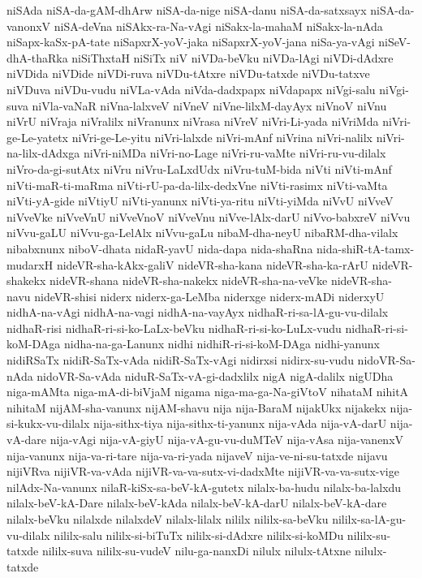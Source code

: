 {niSAda
niSA-da-gAM-dhArw
niSA-da-nige
niSA-danu
niSA-da-satxsayx
niSA-da-vanonxV
niSA-deVna
niSAkx-ra-Na-vAgi
niSakx-la-mahaM
niSakx-la-nAda
niSapx-kaSx-pA-tate
niSapxrX-yoV-jaka
niSapxrX-yoV-jana
niSa-ya-vAgi
niSeV-dhA-thaRka
niSiThxtaH
niSiTx
niV
niVDa-beVku
niVDa-lAgi
niVDi-dAdxre
niVDida
niVDide
niVDi-ruva
niVDu-tAtxre
niVDu-tatxde
niVDu-tatxve
niVDuva
niVDu-vudu
niVLa-vAda
niVda-dadxpapx
niVdapapx
niVgi-salu
niVgi-suva
niVla-vaNaR
niVna-lalxveV
niVneV
niVne-lilxM-dayAyx
niVnoV
niVnu
niVrU
niVraja
niVralilx
niVranunx
niVrasa
niVreV
niVri-Li-yada
niVriMda
niVri-ge-Le-yatetx
niVri-ge-Le-yitu
niVri-lalxde
niVri-mAnf
niVrina
niVri-nalilx
niVri-na-lilx-dAdxga
niVri-niMDa
niVri-no-Lage
niVri-ru-vaMte
niVri-ru-vu-dilalx
niVro-da-gi-sutAtx
niVru
niVru-LaLxdUdx
niVru-tuM-bida
niVti
niVti-mAnf
niVti-maR-ti-maRma
niVti-rU-pa-da-lilx-dedxVne
niVti-rasimx
niVti-vaMta
niVti-yA-gide
niVtiyU
niVti-yanunx
niVti-ya-ritu
niVti-yiMda
niVvU
niVveV
niVveVke
niVveVnU
niVveVnoV
niVveVnu
niVve-lAlx-darU
niVvo-babxreV
niVvu
niVvu-gaLU
niVvu-ga-LelAlx
niVvu-gaLu
nibaM-dha-neyU
nibaRM-dha-vilalx
nibabxnunx
niboV-dhata
nidaR-yavU
nida-dapa
nida-shaRna
nida-shiR-tA-tamx-mudarxH
nideVR-sha-kAkx-galiV
nideVR-sha-kana
nideVR-sha-ka-rArU
nideVR-shakekx
nideVR-shana
nideVR-sha-nakekx
nideVR-sha-na-veVke
nideVR-sha-navu
nideVR-shisi
niderx
niderx-ga-LeMba
niderxge
niderx-mADi
niderxyU
nidhA-na-vAgi
nidhA-na-vagi
nidhA-na-vayAyx
nidhaR-ri-sa-lA-gu-vu-dilalx
nidhaR-risi
nidhaR-ri-si-ko-LaLx-beVku
nidhaR-ri-si-ko-LuLx-vudu
nidhaR-ri-si-koM-DAga
nidha-na-ga-Lanunx
nidhi
nidhiR-ri-si-koM-DAga
nidhi-yanunx
nidiRSaTx
nidiR-SaTx-vAda
nidiR-SaTx-vAgi
nidirxsi
nidirx-su-vudu
nidoVR-Sa-nAda
nidoVR-Sa-vAda
niduR-SaTx-vA-gi-dadxlilx
nigA
nigA-dalilx
nigUDha
niga-mAMta
niga-mA-di-biVjaM
nigama
niga-ma-ga-Na-giVtoV
nihataM
nihitA
nihitaM
nijAM-sha-vanunx
nijAM-shavu
nija
nija-BaraM
nijakUkx
nijakekx
nija-si-kukx-vu-dilalx
nija-sithx-tiya
nija-sithx-ti-yanunx
nija-vAda
nija-vA-darU
nija-vA-dare
nija-vAgi
nija-vA-giyU
nija-vA-gu-vu-duMTeV
nija-vAsa
nija-vanenxV
nija-vanunx
nija-va-ri-tare
nija-va-ri-yada
nijaveV
nija-ve-ni-su-tatxde
nijavu
nijiVRva
nijiVR-va-vAda
nijiVR-va-va-sutx-vi-dadxMte
nijiVR-va-va-sutx-vige
nilAdx-Na-vanunx
nilaR-kiSx-sa-beV-kA-gutetx
nilalx-ba-hudu
nilalx-ba-lalxdu
nilalx-beV-kA-Dare
nilalx-beV-kAda
nilalx-beV-kA-darU
nilalx-beV-kA-dare
nilalx-beVku
nilalxde
nilalxdeV
nilalx-lilalx
nililx
nililx-sa-beVku
nililx-sa-lA-gu-vu-dilalx
nililx-salu
nililx-si-biTuTx
nililx-si-dAdxre
nililx-si-koMDu
nililx-su-tatxde
nililx-suva
nililx-su-vudeV
nilu-ga-nanxDi
nilulx
nilulx-tAtxne
nilulx-tatxde
}
